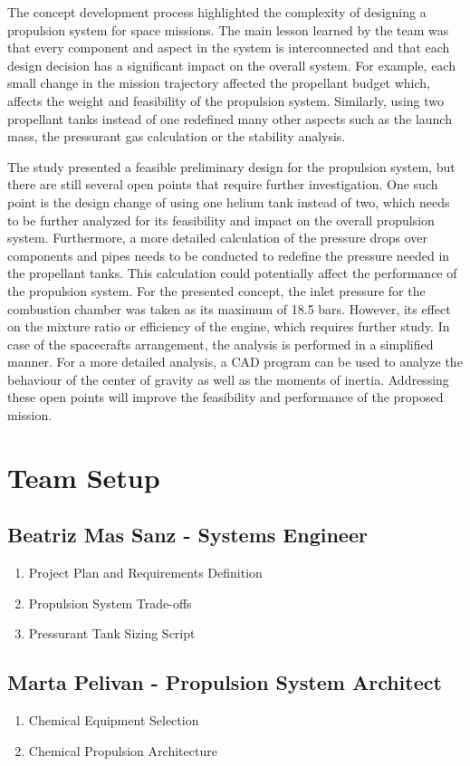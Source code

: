 \documentclass[conference]{IEEEtran}
\begin{document}
The concept development process highlighted the complexity of designing a propulsion system for space missions. The main lesson learned by the team was that every component and aspect in the system is interconnected and that each design decision has a significant impact on the overall system. For example, each small change in the mission trajectory affected the propellant budget which, affects the weight and feasibility of the propulsion system. Similarly, using two propellant tanks instead of one redefined many other aspects such as the launch mass, the pressurant gas calculation or the stability analysis.

The study presented a feasible preliminary design for the propulsion system, but there are still several open points that require further investigation. One such point is the design change of using one helium tank instead of two, which needs to be further analyzed for its feasibility and impact on the overall propulsion system. Furthermore, a more detailed calculation of the pressure drops over components and pipes needs to be conducted to redefine the pressure needed in the propellant tanks. This calculation could potentially affect the performance of the propulsion system. For the presented concept, the inlet pressure for the combustion chamber was taken as its maximum of 18.5 bars. However, its effect on the mixture ratio or efficiency of the engine, which requires further study. In case of the spacecrafts arrangement, the analysis is performed in a simplified manner. For a more detailed analysis, a CAD program can be used to analyze the behaviour of the center of gravity as well as the moments of inertia. Addressing these open points will improve the feasibility and performance of the proposed mission. 

\section{Team Setup}
\subsection{Beatriz Mas Sanz - Systems Engineer}
\begin{enumerate}
    \item Project Plan and Requirements Definition
    \item Propulsion System Trade-offs
    \item Pressurant Tank Sizing Script
\end{enumerate}
\subsection{Marta Pelivan - Propulsion System Architect}
\begin{enumerate}
    \item Chemical Equipment Selection
    \item Chemical Propulsion Architecture
\end{enumerate}
\end{document}
